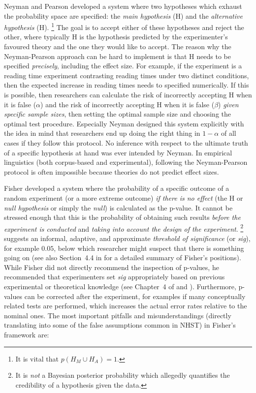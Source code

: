 Neyman and Pearson developed a system where two hypotheses which exhaust the probability space are specified:
  the \textit{main hypothesis} (H) and the \textit{alternative hypothesis} (H).%
\footnote{It is vital that $p(H_M\cup H_A)=1$.}
The goal is to accept either of these hypotheses and reject the other, where typically H is the hypothesis predicted by the experimenter's favoured theory and the one they would like to accept.
The reason why the Neyman-Pearson approach can be hard to implement is that H needs to be specified \textit{precisely}, \ie including the effect size.
For example, if the experiment is a reading time experiment contrasting reading times under two distinct conditions, then the expected increase in reading times needs to specified numerically.
If this is possible, then researchers can calculate the risk of incorrectly accepting H when it is false ($\alpha$) and the risk of incorrectly accepting H when it is false ($\beta$) \textit{given specific sample sizes}, then setting the optimal sample size and choosing the optimal test procedure.
Especially Neyman designed this system explicitly with the idea in mind that researchers end up doing the right thing in $1-\alpha$ of all cases if they follow this protocol.
No inference with respect to the ultimate truth of a specific hypothesis at hand was ever intended by Neyman.
In empirical linguistics (both corpus-based and experimental), following the Neyman-Pearson protocol is often impossible because theories do not predict effect sizes.

Fisher developed a system where the probability of a specific outcome of a random experiment (or a more extreme outcome) \textit{if there is no effect} (the H or \textit{null hypothesis} or simply the \textit{null}) is calculated as the p-value.
It cannot be stressed enough that this is the probability of obtaining such results \textit{before the experiment is conducted} and \textit{taking into account the design of the experiment}.%
\footnote{It is \textit{not} a Bayesian posterior probability which allegedly quantifies the credibility of a hypothesis given the data.}
\textcite[504]{Fisher1926} suggests an informal, adaptive, and approximate \textit{threshold of significance} (or \textit{sig}), for example $0.05$, below which researcher might suspect that there is something going on (see also Section~4.4 in \citealt{Lehmann2011} for a detailed summary of Fisher's positions).
While Fisher did not directly recommend the inspection of p-values, he recommended that experimenters set \textit{sig} appropriately based on previous experimental or theoretical knowledge (see Chapter~4 of \citealt{Lehmann2011} and \citealt{Perezgonzalez2015}).
Furthermore, p-values can be corrected after the experiment, for examples if many conceptually related tests are performed, which increases the actual error rates relative to the nominal ones.
The most important pitfalls and misunderstandings (directly translating into some of the false assumptions common in NHST) in Fisher's framework are:

